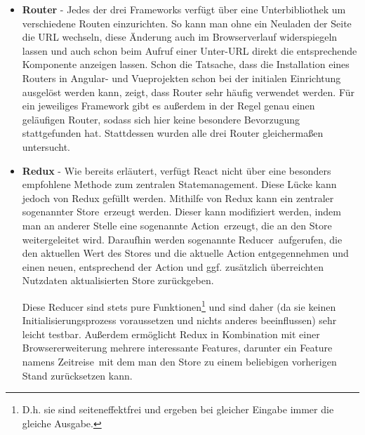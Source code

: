 \begin{itemize}
\item \textbf{Router} - Jedes der drei Frameworks verfügt über eine Unterbibliothek um verschiedene Routen einzurichten. So kann man ohne ein Neuladen der Seite die URL wechseln, diese Änderung auch im Browserverlauf widerspiegeln lassen und auch schon beim Aufruf einer Unter-URL direkt die entsprechende Komponente anzeigen lassen. Schon die Tatsache, dass die Installation eines Routers in Angular- und Vueprojekten schon bei der initialen Einrichtung ausgelöst werden kann, zeigt, dass Router sehr häufig verwendet werden. Für ein jeweiliges Framework gibt es außerdem in der Regel genau einen geläufigen Router, sodass sich hier keine besondere Bevorzugung stattgefunden hat. Stattdessen wurden alle drei Router gleichermaßen untersucht.

%

\item \textbf{Redux} - Wie bereits erläutert, verfügt React nicht über eine besonders empfohlene Methode zum zentralen Statemanagement. Diese Lücke kann jedoch von Redux gefüllt werden. Mithilfe von Redux kann ein zentraler sogenannter \glqq Store\grqq\ erzeugt werden. Dieser kann modifiziert werden, indem man an anderer Stelle eine sogenannte \glqq Action\grqq\ erzeugt, die an den Store weitergeleitet wird. Daraufhin werden sogenannte \glqq Reducer\grqq\ aufgerufen, die den aktuellen Wert des Stores und die aktuelle Action entgegennehmen und einen neuen, entsprechend der Action und ggf. zusätzlich überreichten Nutzdaten aktualisierten Store zurückgeben.

Diese Reducer sind stets pure Funktionen\footnote{D.h. sie sind seiteneffektfrei und ergeben bei gleicher Eingabe immer die gleiche Ausgabe.} und sind daher (da sie keinen Initialisierungsprozess voraussetzen und nichts anderes beeinflussen) sehr leicht testbar. Außerdem ermöglicht Redux in Kombination mit einer Browsererweiterung mehrere interessante Features, darunter ein Feature namens \glqq Zeitreise\grqq\, mit dem man den Store zu einem beliebigen vorherigen Stand zurücksetzen kann.


\end{itemize}
